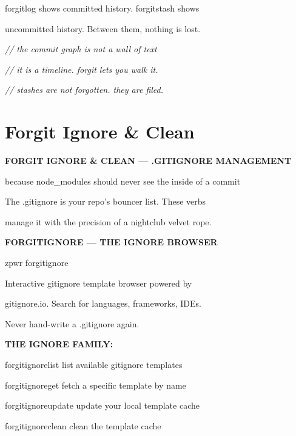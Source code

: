 \documentclass[11pt,a4paper,twoside]{book}
\begin{document}
forgitlog shows committed history. forgitstash shows

uncommitted history. Between them, nothing is lost.

{\small\itshape\color{dimtext} // the commit graph is not a wall of text}

{\small\itshape\color{dimtext} // it is a timeline. forgit lets you walk it.}

{\small\itshape\color{dimtext} // stashes are not forgotten. they are filed.}


\vspace{16pt}

\section{Forgit Ignore \& Clean}


\vspace{10pt}
{\large\bfseries\color{neoncyan} FORGIT IGNORE \& CLEAN — .GITIGNORE MANAGEMENT}\vspace{6pt}

because node\_modules should never see the inside of a commit

The .gitignore is your repo's bouncer list. These verbs

manage it with the precision of a nightclub velvet rope.


\vspace{12pt}
{\bfseries\color{neonyellow} FORGITIGNORE — THE IGNORE BROWSER}\vspace{4pt}

\begin{codebox}
zpwr forgitignore\\
\end{codebox}

Interactive gitignore template browser powered by

gitignore.io. Search for languages, frameworks, IDEs.

Never hand-write a .gitignore again.


\vspace{12pt}
{\bfseries\color{neonyellow} THE IGNORE FAMILY:}\vspace{4pt}

forgitignorelist     list available gitignore templates

forgitignoreget      fetch a specific template by name

forgitignoreupdate   update your local template cache

forgitignoreclean    clean the template cache
\end{document}
